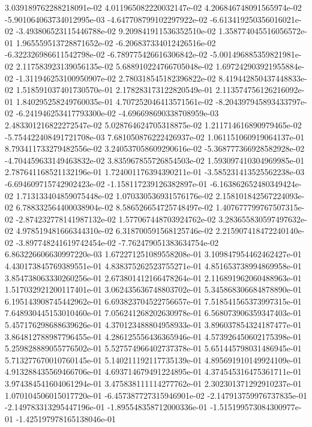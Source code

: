 3.039189762288218091e-02
4.011965082220032147e-02
4.206846748091565974e-02
-5.901064063734012995e-03
-4.647708799102297922e-02
-6.613419250356016021e-02
-3.493806523115446788e-02
9.209841911536352510e-02
1.358774045516056572e-01
1.965559513728871652e-02
-6.206837334012426516e-02
-6.322326986611542798e-02
-6.789775426616306842e-02
-5.001496885359821981e-02
2.117583923139056135e-02
5.688910224766705048e-02
1.697242903921955884e-02
-1.311946253100950907e-02
2.780318545182396822e-02
8.419442850437448833e-02
1.518591037401730570e-01
2.178283173122820549e-01
2.113574756126216092e-01
1.840295258249760035e-01
4.707252046413571561e-02
-8.204397945893433797e-02
-6.241946253417793300e-02
-4.696698690338708959e-03
2.483301216822272547e-02
5.028764624705318875e-02
1.211714616890979465e-02
-5.754422408491721708e-03
7.681050876222426937e-02
1.061151060919064137e-01
8.793411733279482556e-02
3.240537058609290616e-02
-5.368777366928582928e-02
-4.704459633149463832e-02
3.835967855726854503e-02
1.593097410304969985e-01
2.787641168521132196e-01
1.724001176394390211e-01
-3.585231413525562238e-03
-6.694609715742902423e-02
-1.158117239126382897e-01
-6.163862652480349424e-02
1.713133404859075448e-02
1.070330536931576176e-02
2.158101842567224093e-02
6.788332564400038904e-02
8.586526654725748497e-02
1.407677799767507315e-02
-2.874232778141987132e-02
1.577067448703924762e-02
3.283655830597497632e-02
4.978519481666344310e-02
6.318700591568125746e-02
2.215907418472240140e-02
-3.897748241619742454e-02
-7.762479051383634754e-02
6.863226606630997220e-03
1.672271251089558208e-01
3.109847954462462427e-01
4.430173845769389551e-01
4.838375262523755271e-01
4.851653738994869958e-01
3.854738063330260256e-01
2.673801412166478264e-01
2.116891962060488963e-01
1.517032921200117401e-01
3.062435636748803702e-01
5.345868306684878890e-01
6.195143908745442962e-01
6.693823704522756657e-01
7.518541565373997315e-01
7.648930445153010460e-01
7.056241268202630978e-01
6.568073906359347403e-01
5.457176298688639626e-01
4.370123488804958933e-01
3.896037854324187477e-01
3.864812788987796455e-01
4.286125556436365946e-01
4.573926450602175398e-01
5.259828889055776502e-01
5.527574966402737378e-01
5.651445798031486945e-01
5.713277670010760145e-01
5.140211192117735139e-01
4.895691910149924109e-01
4.913288435569466706e-01
4.693714679491224895e-01
4.374545316475361711e-01
3.974384541604061294e-01
3.475838111114277762e-01
2.302301371292910237e-01
1.070104506015017720e-01
-6.457387727315946901e-02
-2.147913759976737835e-01
-2.149783313295447196e-01
-1.895548358712000336e-01
-1.515199573084300977e-01
-1.425197978165138046e-01
